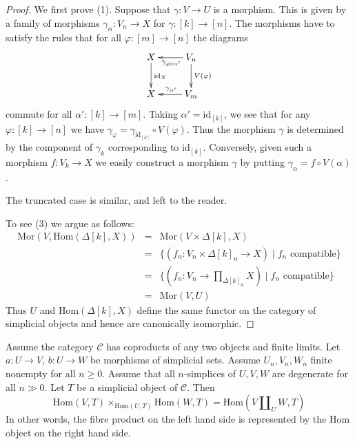 \begin{proof}
We first prove (1).
Suppose that $\gamma : V \to U$ is a morphism.
This is given by a family of morphisms
$\gamma_{\alpha} : V_n \to X$ for $\gamma : [k] \to [n]$.
The morphisms have to satisfy the
rules that for all $\varphi : [m] \to [n]$ the diagrams
$$
\xymatrix{
X \ar[d]^{\text{id}_X} &
V_n \ar[d]^{V(\varphi)}
\ar[l]^{\gamma_{\varphi \circ \alpha'}} \\
X &
V_m \ar[l]_{\gamma_{\alpha'}}
}
$$
commute for all $\alpha' : [k] \to [m]$.
Taking $\alpha' = \text{id}_{[k]}$, we see that
for any $\varphi : [k] \to [n]$ we have $\gamma_\varphi =
\gamma_{\text{id}_{[k]}} \circ V(\varphi)$. Thus the morphism
$\gamma$ is determined by the component of $\gamma_k$
corresponding to $\text{id}_{[k]}$. Conversely,
given such a morphism $f : V_k \to X$ we easily
construct a morphism $\gamma$ by putting
$\gamma_\alpha = f \circ V(\alpha)$.

\medskip\noindent
The truncated case is similar, and left to the reader.

\medskip\noindent
To see (3) we argue as follows:
\begin{eqnarray*}
\text{Mor}(V, \text{Hom}(\Delta[k], X)) & = &
\text{Mor}(V \times \Delta[k], X) \\
& = & \{ (f_n : V_n \times \Delta[k]_n \to X) \mid
f_n \text{ compatible}\} \\
& = & \{ (f_n : V_n \to \prod\nolimits_{\Delta[k]_n} X) \mid
f_n \text{ compatible}\} \\
& = & \text{Mor}(V, U)
\end{eqnarray*}
Thus $U$ and $\text{Hom}(\Delta[k], X)$ define the same
functor on the category of simplicial objects and
hence are canonically isomorphic.
\end{proof}

\begin{lemma}
\label{lemma-hom-from-coprod}
Assume the category $\mathcal{C}$
has coproducts of any two objects and finite
limits. Let $a : U \to V$, $b : U \to W$
be morphisms of simplicial sets.
Assume $U_n, V_n, W_n$ finite nonempty for all $n \geq 0$.
Assume that all $n$-simplices of $U, V, W$
are degenerate for all $n \gg 0$.
Let $T$ be a simplicial object of $\mathcal{C}$.
Then
$$
\text{Hom}(V, T) \times_{\text{Hom}(U, T)} \text{Hom}(W, T)
=
\text{Hom}(V \amalg_U W, T)
$$
In other words, the fibre product on the left hand
side is represented by the Hom object on the right hand side.
\end{lemma}

